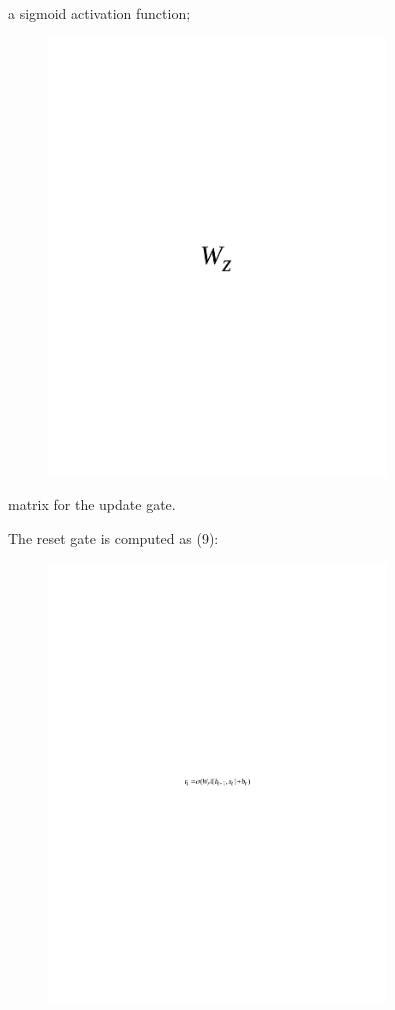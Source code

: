a sigmoid activation function;
\begin{figure}[H]
	\centering
	\includegraphics[width=0.8\textwidth]{media/ict/image66}
	\caption*{}
\end{figure}

matrix for the update gate.

The reset gate is computed as (9):

\begin{figure}[H]
	\centering
	\includegraphics[width=0.8\textwidth]{media/ict/image67}
	\caption*{}
\end{figure}


